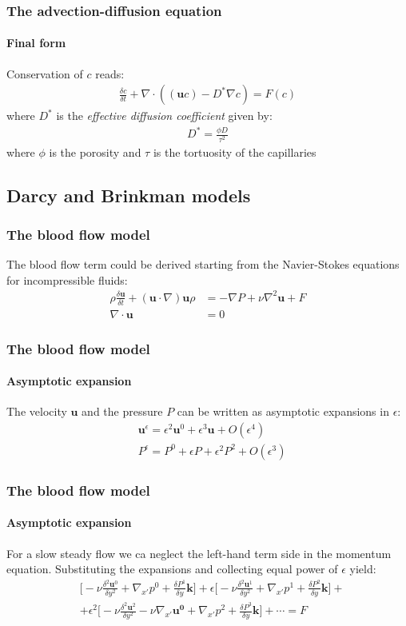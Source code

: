 \documentclass{beamer}
\begin{document}
\begin{frame}
\frametitle{The advection-diffusion equation}
\framesubtitle{Final form}
Conservation of $c$ reads:
\begin{align*}
\frac{\delta c}{\delta t}+\nabla \cdot \left(\left(\mathbf{u} c\right)-D^*\nabla c\right)=F(c)
\end{align*}
where $D^*$ is the {\em effective diffusion coefficient} given by:
\begin{align*}
D^*=\frac{\phi D}{\tau^2}
\end{align*}
where $\phi$ is the porosity and $\tau$ is the tortuosity of the capillaries
\end{frame}

\subsection{Darcy and Brinkman models}
\begin{frame}
\frametitle{The blood flow model}
The blood flow term could be derived starting from the  Navier-Stokes equations for incompressible fluids:
\begin{align*}
\rho \frac{\delta \mathbf{u}}{\delta t}+(\mathbf{u}\cdot\nabla)\mathbf{u}\rho&=-\nabla P+\nu \nabla^2 \mathbf{u}+F\\
\nabla \cdot \mathbf{u}&=0
\end{align*}
\end{frame}

\begin{frame}
\frametitle{The blood flow model}
\framesubtitle{Asymptotic expansion}
The velocity $\mathbf{u}$ and the pressure $P$  can be written  as  asymptotic expansions in $\epsilon$:
\begin{align*}
&\mathbf{u}^{\epsilon}=\epsilon^2\mathbf{u}^0+\epsilon^3\mathbf{u}+O(\epsilon^4)\\
&P^{\epsilon}=P^0+\epsilon P+ \epsilon^{2}P^2+O(\epsilon^3)
\end{align*}
\end{frame}

\begin{frame}
\frametitle{The blood flow model}
\framesubtitle{Asymptotic expansion}
For a slow steady flow we ca neglect the left-hand term side in the momentum equation. Substituting the expansions and collecting equal power of $\epsilon$ yield:
\begin{align*}
&\Big[-\nu\frac{\delta^2 \mathbf{u}^0}{\delta y^2}+\nabla_{x'}p^0+\frac{\delta P^1}{\delta y}\mathbf{k}\Big]+
\epsilon\Big[-\nu\frac{\delta^2 \mathbf{u}^1}{\delta y^2}+\nabla_{x'}p^1+\frac{\delta P^2}{\delta y}\mathbf{k}\Big]+\\
&+\epsilon^2 \Big[-\nu\frac{\delta^2 \mathbf{u}^2}{\delta y^2}-\nu\nabla_{x'}\mathbf{u^0}+\nabla_{x'}p^2+\frac{\delta P^3}{\delta y}\mathbf{k}\Big]+\cdots=F
\end{align*}
\end{frame}
\end{document}
